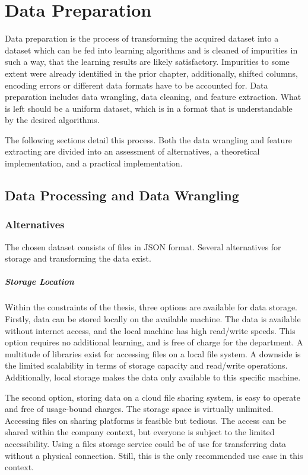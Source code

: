 \chapter{Data Preparation}
    Data preparation is the process of transforming the acquired dataset into a dataset which can be fed into learning algorithms and is cleaned of impurities in such a way, that the learning results are likely satisfactory. Impurities to some extent were already identified in the prior chapter, additionally, shifted columns, encoding errors or different data formats have to be accounted for.
	Data preparation includes data wrangling, data cleaning, and feature extraction. What is left should be a uniform dataset, which is in a format that is understandable by the desired algorithms.
	
	The following sections detail this process. Both the data wrangling and feature extracting are divided into an assessment of alternatives, a theoretical implementation, and a practical implementation.	
	
	\section{Data Processing and Data Wrangling}

        \subsection{Alternatives}
        The chosen dataset consists of files in \ac{JSON} format. Several alternatives for storage and transforming the data exist. 
        
        \paragraph{Storage Location}
        Within the constraints of the thesis, three options are available for data storage. Firstly, data can be stored locally on the available machine. The data is available without internet access, and the local machine has high read/write speeds. This option requires no additional learning, and is free of charge for the department. A multitude of libraries exist for accessing files on a local file system. A downside is the limited scalability in terms of storage capacity and read/write operations. Additionally, local storage makes the data only available to this specific machine.
        
        The second option, storing data on a cloud file sharing system, is easy to operate and free of usage-bound charges. The storage space is virtually unlimited. Accessing files on sharing platforms is feasible but tedious. The access can be shared within the company context, but everyone is subject to the limited accessibility. Using a files storage service could be of use for transferring data without a physical connection. Still, this is the only recommended use case in this context.
        
